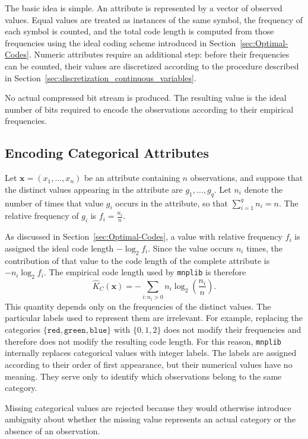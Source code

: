 The basic idea is simple. An attribute is represented by a vector of observed values. Equal values are treated as instances of the same symbol, the frequency of each symbol is counted, and the total code length is computed from those frequencies using the ideal coding scheme introduced in Section~\ref{sec:Optimal-Codes}. Numeric attributes require an additional step: before their frequencies can be counted, their values are discretized according to the procedure described in Section~\ref{sec:discretization_continuous_variables}.

No actual compressed bit stream is produced. The resulting value is the ideal number of bits required to encode the observations according to their empirical frequencies.

\subsection*{Encoding Categorical Attributes}

Let $\mathbf{x}=(x_1,\ldots,x_n)$ be an attribute containing $n$ observations, and suppose that the distinct values appearing in the attribute are $g_1,\ldots,g_q$. Let $n_i$ denote the number of times that value $g_i$ occurs in the attribute, so that $\sum_{i=1}^{q} n_i=n$. The relative frequency of $g_i$ is $f_i=\frac{n_i}{n}$.

As discussed in Section~\ref{sec:Optimal-Codes}, a value with relative frequency $f_i$ is assigned the ideal code length $-\log_2 f_i$. Since the value occurs $n_i$ times, the contribution of that value to the code length of the complete attribute is $-n_i\log_2 f_i$. The empirical code length used by \texttt{mnplib} is therefore
$$
\hat{K}_C(\mathbf{x})
=
-\sum_{i:n_i>0}
n_i\log_2\left(\frac{n_i}{n}\right).
$$
This quantity depends only on the frequencies of the distinct values. The particular labels used to represent them are irrelevant. For example, replacing the categories $\{\texttt{red},\texttt{green},\texttt{blue}\}$ with $\{0,1,2\}$ does not modify their frequencies and therefore does not modify the resulting code length. For this reason, \texttt{mnplib} internally replaces categorical values with integer labels. The labels are assigned according to their order of first appearance, but their numerical values have no meaning. They serve only to identify which observations belong to the same category.

Missing categorical values are rejected because they would otherwise introduce ambiguity about whether the missing value represents an actual category or the absence of an observation.


